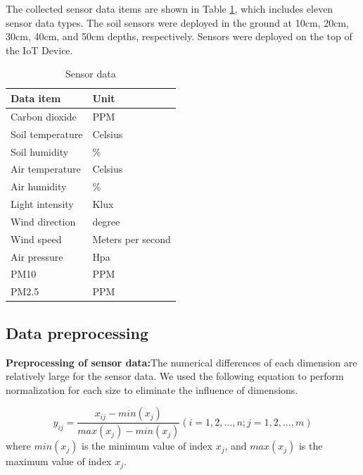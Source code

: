 \documentclass[acmsmall,manuscript, screen, review]{acmart}
\begin{document}
The collected sensor data items are shown in Table \ref{tab:sensor_and_data_items}, which includes eleven sensor data types. The soil sensors were deployed in the ground at 10cm, 20cm, 30cm, 40cm, and 50cm depths, respectively. Sensors were deployed on the top of the IoT Device.


\begin{table}
  \caption{Sensor data}
  \label{tab:sensor_and_data_items}
  \begin{tabular}{ll}
    \hline
    Data item & Unit \\
    \hline
    Carbon dioxide & PPM \\
    Soil temperature & Celsius \\
    Soil humidity & \% \\
    Air temperature & Celsius \\
    Air humidity & \% \\
    Light intensity & Klux \\
    Wind direction & degree \\
    Wind speed & Meters per second \\
    Air pressure & Hpa \\
    PM10  & PPM \\
    PM2.5 & PPM \\
    \hline
    \end{tabular}%
\end{table}

\subsection{Data preprocessing}
\textbf{Preprocessing of sensor data:}The numerical differences of each dimension are relatively large for the sensor data. We used the following equation to perform normalization for each size to eliminate the influence of dimensions.

\begin{equation}
  y_{ij}=\frac{x_{ij}-min\left(x_j\right)}{max\left(x_j\right)-min\left(x_j\right)}\left(i=1,2,\ldots,n;j=1,2,\ldots,m\right)
\end{equation}
where \begin{math}
  min(x_j)
\end{math} is the minimum value of index \begin{math}
  x_j
\end{math}, and
\begin{math}
  max(x_j)
\end{math} is the maximum value of index \begin{math}
  x_j
\end{math}.
\end{document}
